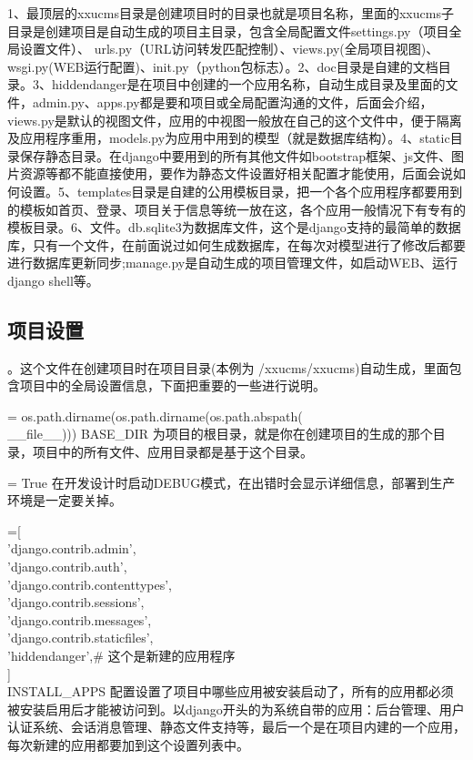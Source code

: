 \documentclass[a4paper]{ctexart}
\begin{document}
           {\color{red}{目录及文件详细说明：}}1、最顶层的xxucms目录是创建项目时的目录也就是项目名称，里面的xxucms子目录是创建项目是自动生成的项目主目录，包含全局配置文件settings.py（项目全局设置文件）、
           urls.py（URL访问转发匹配控制）、views.py(全局项目视图)、wsgi.py(WEB运行配置)、init.py（python包标志）。2、doc目录是自建的文档目录。3、hiddendanger是在项目中创建的一个应用名称，自动生成目录及里面的文件，admin.py、apps.py都是要和项目或全局配置沟通的文件，后面会介绍，views.py是默认的视图文件，应用的中视图一般放在自己的这个文件中，便于隔离及应用程序重用，models.py为应用中用到的模型（就是数据库结构）。4、static目录保存静态目录。在django中要用到的所有其他文件如bootstrap框架、js文件、图片资源等都不能直接使用，要作为静态文件设置好相关配置才能使用，后面会说如何设置。5、templates目录是自建的公用模板目录，把一个各个应用程序都要用到的模板如首页、登录、项目关于信息等统一放在这，各个应用一般情况下有专有的模板目录。6、文件。db.sqlite3为数据库文件，这个是django支持的最简单的数据库，只有一个文件，在前面说过如何生成数据库，在每次对模型进行了修改后都要进行数据库更新同步;manage.py是自动生成的项目管理文件，如启动WEB、运行django shell等。
           \subsection{项目设置}
           {\color{red}{一、settings.py}}。这个文件在创建项目时在项目目录(本例为 /xxucms/xxucms)自动生成，里面包含项目中的全局设置信息，下面把重要的一些进行说明。
           
            {\color{blue}{BASE\_DIR}} = os.path.dirname(os.path.dirname(os.path.abspath(\\\_\_file\_\_))) BASE\_DIR 为项目的根目录，就是你在创建项目的生成的那个目录，项目中的所有文件、应用目录都是基于这个目录。

            {\color{blue}{DEBUG}} = True   在开发设计时启动DEBUG模式，在出错时会显示详细信息，部署到生产环境是一定要关掉。

            {\color{blue}{INSTALLED\_APPS}} =[\\                
                'django.contrib.admin',\\                
                'django.contrib.auth',\\
                'django.contrib.contenttypes',\\
                'django.contrib.sessions',\\
                'django.contrib.messages',\\
                'django.contrib.staticfiles',\\
                'hiddendanger',\# 这个是新建的应用程序\\
            ]\\
            \indent INSTALL\_APPS 配置设置了项目中哪些应用被安装启动了，所有的应用都必须被安装启用后才能被访问到。以django开头的为系统自带的应用：后台管理、用户认证系统、会话消息管理、静态文件支持等，最后一个是在项目内建的一个应用，每次新建的应用都要加到这个设置列表中。
\end{document}
